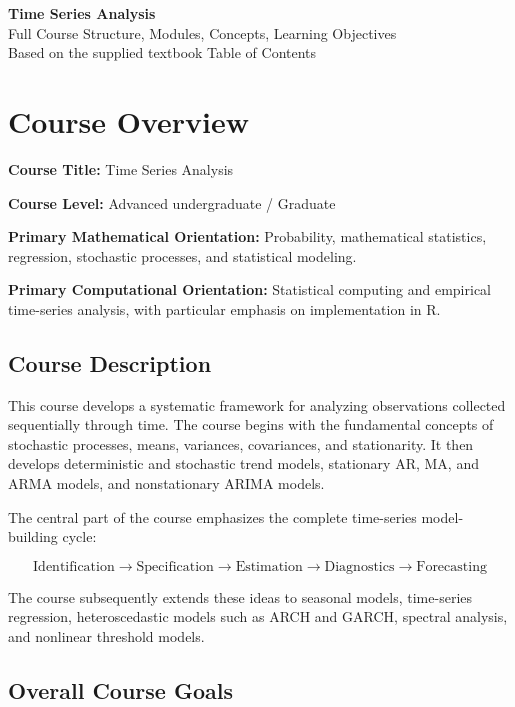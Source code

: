 \documentclass[11pt,a4paper]{article}
\begin{document}
\begin{center}
    {\Huge\bfseries Time Series Analysis}\\[0.4cm]
    {\Large Full Course Structure, Modules, Concepts, Learning Objectives}\\[0.4cm]
    {\large Based on the supplied textbook Table of Contents}
\end{center}

\vspace{0.5cm}

\section{Course Overview}

\textbf{Course Title:} Time Series Analysis

\textbf{Course Level:} Advanced undergraduate / Graduate

\textbf{Primary Mathematical Orientation:}
Probability, mathematical statistics, regression, stochastic processes, and
statistical modeling.

\textbf{Primary Computational Orientation:}
Statistical computing and empirical time-series analysis, with particular
emphasis on implementation in R.

\subsection{Course Description}

This course develops a systematic framework for analyzing observations
collected sequentially through time. The course begins with the fundamental
concepts of stochastic processes, means, variances, covariances, and
stationarity. It then develops deterministic and stochastic trend models,
stationary AR, MA, and ARMA models, and nonstationary ARIMA models.

The central part of the course emphasizes the complete time-series
model-building cycle:

\[
\boxed{
\text{Identification}
\rightarrow
\text{Specification}
\rightarrow
\text{Estimation}
\rightarrow
\text{Diagnostics}
\rightarrow
\text{Forecasting}
}
\]

The course subsequently extends these ideas to seasonal models, time-series
regression, heteroscedastic models such as ARCH and GARCH, spectral analysis,
and nonlinear threshold models.

\subsection{Overall Course Goals}
\end{document}
